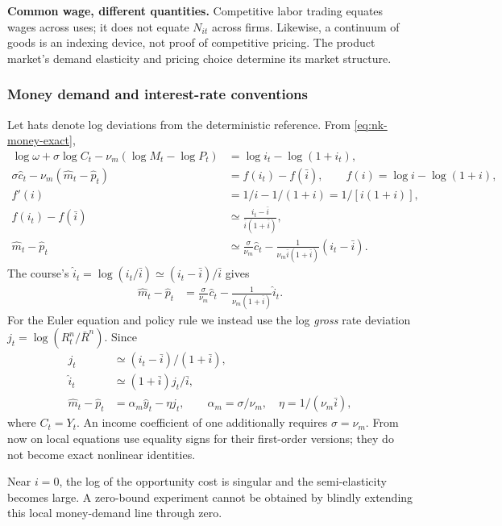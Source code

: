 \begin{blueblock}
\textbf{Common wage, different quantities.}
Competitive labor trading equates wages across uses; it does not equate
$N_{it}$ across firms. Likewise, a continuum of goods is an indexing device,
not proof of competitive pricing. The product market's demand elasticity and
pricing choice determine its market structure.
\end{blueblock}

\subsubsection{Money demand and interest-rate conventions}

Let hats denote log deviations from the deterministic reference. From
\eqref{eq:nk-money-exact},
\begin{align}
 \log\omega+\sigma\log C_t-\nu_m(\log M_t-\log P_t)
 &=\log i_t-\log(1+i_t),\\
 \sigma\hat c_t-\nu_m(\hat m_t-\hat p_t)
 &=f(i_t)-f(\bar i),\qquad f(i)=\log i-\log(1+i),\\
 f'(i)&=1/i-1/(1+i)=1/[i(1+i)],\\
 f(i_t)-f(\bar i)&\simeq\frac{i_t-\bar i}{\bar i(1+\bar i)},\\
 \hat m_t-\hat p_t
 &\simeq\frac\sigma{\nu_m}\hat c_t
   -\frac1{\nu_m\bar i(1+\bar i)}(i_t-\bar i).
\end{align}
The course's $\hat i_t=\log(i_t/\bar i)\simeq(i_t-\bar i)/\bar i$ gives
\begin{align}
 \hat m_t-\hat p_t&=\frac\sigma{\nu_m}\hat c_t
             -\frac1{\nu_m(1+\bar i)}\hat i_t.
\end{align}
For the Euler equation and policy rule we instead use the log \emph{gross}
rate deviation $j_t=\log(R_t^n/\bar R^n)$. Since
\begin{align}
 j_t&\simeq(i_t-\bar i)/(1+\bar i),\\
 \hat i_t&\simeq(1+\bar i)j_t/\bar i,\\
 \hat m_t-\hat p_t&=\alpha_m\hat y_t-\eta j_t,
 \qquad\alpha_m=\sigma/\nu_m,\quad\eta=1/(\nu_m\bar i),
 \label{eq:nk-money-linear}
\end{align}
where $C_t=Y_t$. An income coefficient of one additionally requires
$\sigma=\nu_m$. From now on local equations use equality signs for their
first-order versions; they do not become exact nonlinear identities.

Near $i=0$, the log of the opportunity cost is singular and the semi-elasticity
becomes large. A zero-bound experiment cannot be obtained by blindly extending
this local money-demand line through zero.

